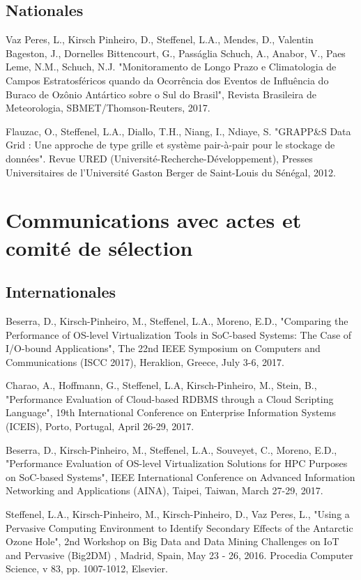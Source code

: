\documentclass[final,twoside]{hdr} %
\begin{document}
\subsection*{Nationales}

Vaz Peres, L., Kirsch Pinheiro, D., Steffenel, L.A., Mendes, D., Valentin Bageston, J., Dornelles Bittencourt, G., Passáglia Schuch, A., Anabor, V., Paes Leme, N.M., Schuch, N.J. "Monitoramento de Longo Prazo e Climatologia de Campos Estratosféricos quando da Ocorrência dos Eventos de Influência do Buraco de Ozônio Antártico sobre o Sul do Brasil", Revista Brasileira de Meteorologia, SBMET/Thomson-Reuters, 2017.

Flauzac, O., Steffenel, L.A., Diallo, T.H., Niang, I., Ndiaye, S. "GRAPP\&S Data Grid : Une approche de type grille et système pair-à-pair pour le stockage de données". Revue URED (Université-Recherche-Développement), Presses Universitaires de l'Université Gaston Berger de Saint-Louis du Sénégal, 2012.

\section*{Communications avec actes et comité de sélection}

\subsection*{Internationales}

Beserra, D., Kirsch-Pinheiro, M., Steffenel, L.A.,  Moreno, E.D., "Comparing the Performance of OS-level Virtualization Tools in SoC-based Systems: The Case of I/O-bound Applications", The 22nd IEEE Symposium on Computers and Communications (ISCC 2017), Heraklion, Greece, July 3-6, 2017.

Charao, A., Hoffmann, G., Steffenel, L.A, Kirsch-Pinheiro, M., Stein, B., "Performance Evaluation of Cloud-based RDBMS through a Cloud Scripting Language", 19th International Conference on Enterprise Information Systems (ICEIS), Porto, Portugal, April 26-29, 2017.

Beserra, D., Kirsch-Pinheiro, M., Steffenel, L.A., Souveyet, C., Moreno, E.D., "Performance Evaluation of OS-level Virtualization Solutions for HPC Purposes on SoC-based Systems", IEEE International Conference on  Advanced Information Networking and Applications (AINA), Taipei, Taiwan, March 27-29, 2017.

Steffenel, L.A., Kirsch-Pinheiro, M., Kirsch-Pinheiro, D., Vaz Peres, L., "Using a Pervasive Computing Environment to Identify Secondary Effects of the Antarctic Ozone Hole", 2nd Workshop on Big Data and Data Mining Challenges on IoT and Pervasive (Big2DM) , Madrid, Spain, May 23 - 26, 2016. Procedia Computer Science, v 83, pp. 1007-1012, Elsevier. 
\end{document}
